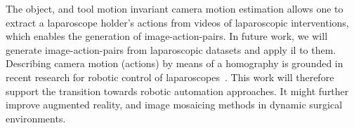 
The object, and tool motion invariant camera motion estimation allows one to extract a laparoscope holder's actions from videos of laparoscopic interventions, which enables the generation of image-action-pairs. In future work, we will generate image-action-pairs from laparoscopic datasets and apply \gls{il} to them. Describing camera motion (actions) by means of a homography is grounded in recent research for robotic control of laparoscopes~\cite{huber2021homographybased}. This work will therefore support the transition towards robotic automation approaches. It might further improve augmented reality, and image mosaicing methods in dynamic surgical environments.

